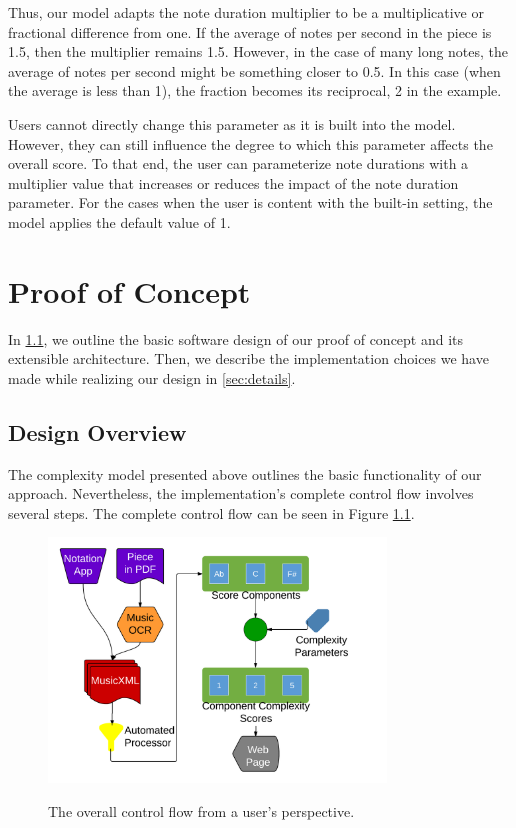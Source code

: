 \documentclass[12pt]{report}
\begin{document}
Thus, our model adapts the note duration multiplier to be a multiplicative or fractional difference from one. If the average of notes per second in the piece is 1.5, then the multiplier remains 1.5. However, in the case of many long notes, the average of notes per second might be something closer to 0.5. In this case (when the average is less than 1), the fraction becomes its reciprocal, 2 in the example.

Users cannot directly change this parameter as it is built into the model. However, they can still influence the degree to which this parameter affects the overall score. To that end, the user can parameterize note durations with a multiplier value that increases or reduces the impact of the note duration parameter. For the cases when the user is content with the built-in setting, the model applies the default value of 1.

\chapter{Proof of Concept} 
\label{sec:proof}

In \ref{sec:design}, we outline the basic software design of our proof of concept and its extensible architecture. Then, we describe the implementation choices we have made while realizing our design in \ref{sec:details}.

\section{Design Overview} 
\label{sec:design}

The complexity model presented above outlines the basic functionality of our approach. Nevertheless, the implementation's complete control flow involves several steps. The complete control flow can be seen in Figure \ref{image:flow}.

\begin{figure}[ht!]
	\centering
		\caption{The overall control flow from a user's perspective.}
		\includegraphics[width=0.8\textwidth]{JoinedCropped.png}
		\label{image:flow}
\end{figure}
\end{document}
